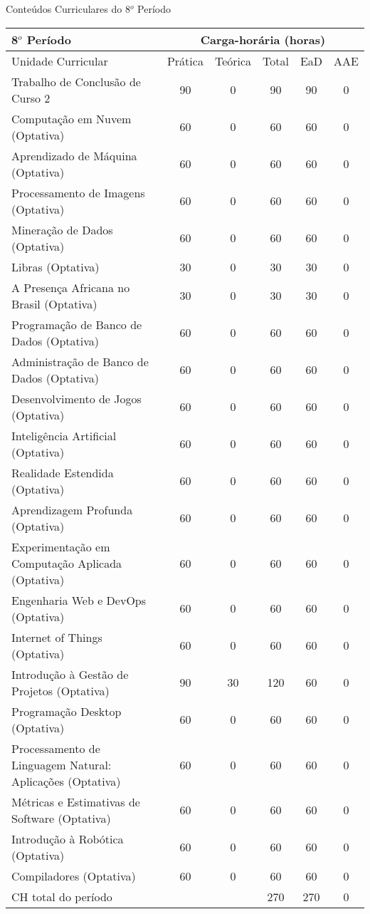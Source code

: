 \begin{quadro}[ht!]
\centering
\caption{Conteúdos Curriculares do 8$^o$ Período}\label{qua:periodo8}
\begin{tabular}{|p{8.0cm}|c|c|c|c|c|}
\hline
\rowcolor{blue1} 8$^o$ Período & \multicolumn{5}{|c|}{\centering Carga-horária (horas)} \\ \hline
\rowcolor{blue1} Unidade Curricular & Prática & Teórica & Total & EaD & AAE \\ \hline
Trabalho de Conclusão de Curso 2 & 90 & 0 & 90 & 90	&	0 \\	\hline
Computação em Nuvem (Optativa) & 60 & 0 & 60 & 60	&	0 \\	\hline
Aprendizado de Máquina (Optativa) & 60 & 0 & 60 & 60	&	0 \\	\hline
Processamento de Imagens (Optativa) & 60 & 0 & 60 & 60	&	0 \\	\hline
Mineração de Dados (Optativa) & 60 & 0 & 60 & 60	&	0 \\	\hline
Libras (Optativa) & 30 & 0 & 30 & 30	&	0 \\	\hline
A Presença Africana no Brasil (Optativa) & 30 & 0 & 30 & 30	&	0 \\	\hline
Programação de Banco de Dados (Optativa) & 60 & 0 & 60 & 60	&	0 \\	\hline
Administração de Banco de Dados (Optativa) & 60 & 0 & 60 & 60	&	0 \\	\hline
Desenvolvimento de Jogos (Optativa) & 60 & 0 & 60 & 60	&	0 \\	\hline
Inteligência Artificial (Optativa) & 60 & 0 & 60 & 60	&	0 \\	\hline
Realidade Estendida (Optativa) & 60 & 0 & 60 & 60	&	0 \\	\hline
Aprendizagem Profunda (Optativa) & 60 & 0 & 60 & 60	&	0 \\	\hline
Experimentação em Computação Aplicada (Optativa) & 60 & 0 & 60 & 60	&	0 \\	\hline
Engenharia Web e DevOps (Optativa) & 60 & 0 & 60 & 60	&	0 \\	\hline
Internet of Things (Optativa) & 60 & 0 & 60 & 60	&	0 \\	\hline
Introdução à Gestão de Projetos (Optativa) & 90 & 30 & 120 & 60	&	0 \\	\hline
Programação Desktop (Optativa) & 60 & 0 & 60 & 60	&	0 \\	\hline
Processamento de Linguagem Natural: Aplicações (Optativa) & 60 & 0 & 60 & 60	&	0 \\	\hline
Métricas e Estimativas de Software (Optativa) & 60 & 0 & 60 & 60	&	0 \\	\hline
Introdução à Robótica (Optativa) & 60 & 0 & 60 & 60	&	0 \\	\hline
Compiladores (Optativa) & 60 & 0 & 60 & 60	&	0 \\	\hline
CH total do período & \multicolumn{2}{p{3.3cm}|}{\cellcolor{blue1}} & 270 & 270	&	0 \\ \hline
 \end{tabular} \end{quadro}